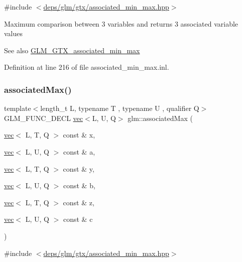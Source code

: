 {\ttfamily \#include $<$\hyperlink{associated__min__max_8hpp}{deps/glm/gtx/associated\+\_\+min\+\_\+max.\+hpp}$>$}

Maximum comparison between 3 variables and returns 3 associated variable values \begin{DoxySeeAlso}{See also}
\hyperlink{group__gtx__associated__min__max}{G\+L\+M\+\_\+\+G\+T\+X\+\_\+associated\+\_\+min\+\_\+max} 
\end{DoxySeeAlso}


Definition at line 216 of file associated\+\_\+min\+\_\+max.\+inl.

\mbox{\label{group__gtx__associated__min__max_gab84fdc35016a31e8cd0cbb8296bddf7c}} 
\subsubsection{\texorpdfstring{associated\+Max()}{associatedMax()}\hspace{0.1cm}{\footnotesize\ttfamily [6/12]}}
{\footnotesize\ttfamily template$<$length\+\_\+t L, typename T , typename U , qualifier Q$>$ \\
G\+L\+M\+\_\+\+F\+U\+N\+C\+\_\+\+D\+E\+CL \hyperlink{structglm_1_1vec}{vec}$<$L, U, Q$>$ glm\+::associated\+Max (\begin{DoxyParamCaption}\item[{\hyperlink{structglm_1_1vec}{vec}$<$ L, T, Q $>$ const \&}]{x,  }\item[{\hyperlink{structglm_1_1vec}{vec}$<$ L, U, Q $>$ const \&}]{a,  }\item[{\hyperlink{structglm_1_1vec}{vec}$<$ L, T, Q $>$ const \&}]{y,  }\item[{\hyperlink{structglm_1_1vec}{vec}$<$ L, U, Q $>$ const \&}]{b,  }\item[{\hyperlink{structglm_1_1vec}{vec}$<$ L, T, Q $>$ const \&}]{z,  }\item[{\hyperlink{structglm_1_1vec}{vec}$<$ L, U, Q $>$ const \&}]{c }\end{DoxyParamCaption})}



{\ttfamily \#include $<$\hyperlink{associated__min__max_8hpp}{deps/glm/gtx/associated\+\_\+min\+\_\+max.\+hpp}$>$}

